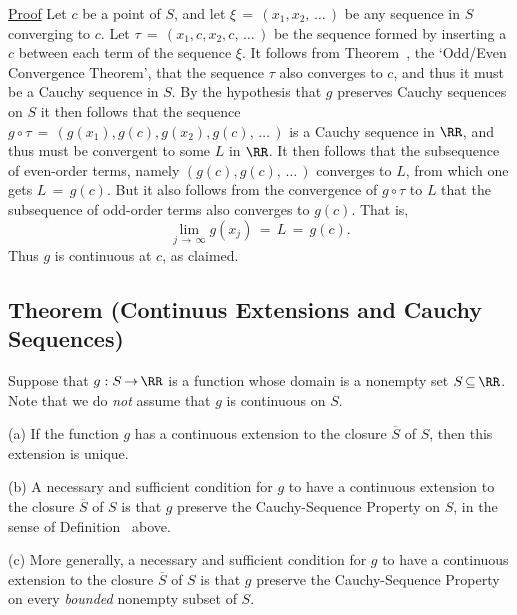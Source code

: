         \underline{Proof} Let $c$ be a point of $S$, and let ${\xi} \,=\, (x_{1},x_{2},\,{\ldots}\,)$ be any sequence in $S$ converging to $c$.
    Let ${\tau} \,=\, (x_{1},c,x_{2},c,\,{\ldots}\,)$ be the sequence formed by inserting a $c$ between each term of the sequence ${\xi}$.
    It follows from Theorem~, the `Odd/Even Convergence Theorem',
that the sequence ${\tau}$ also converges to $c$, and thus it must be a Cauchy sequence in $S$.
    By the hypothesis that $g$ preserves Cauchy sequences on $S$ it then follows that the sequence $g{\circ}{\tau} \,=\, (g(x_{1}),g(c),g(x_{2}),g(c),\,{\ldots}\,)$ is a Cauchy sequence in ${\RR}$, and thus must be convergent to some $L$ in ${\RR}$.
    It then follows that the subsequence of even-order terms, namely $(g(c),g(c),\,{\ldots}\,)$ converges to $L$, from which one gets $L \,=\, g(c)$.
    But it also follows from the convergence of $g{\circ}{\tau}$ to $L$ that the subsequence of odd-order terms also converges to $g(c)$.
    That is,
        \begin{displaymath}
        \lim_{j \,{\rightarrow}\, {\infty}} g(x_{j}) \,=\, L \,=\, g(c).
        \end{displaymath}
    Thus $g$ is continuous at $c$, as claimed.

\V
\V

            \subsection{\small{\bf Theorem} (Continuus Extensions and Cauchy Sequences)}
            \label{ThmF20.90}

\V

        Suppose that $g:S \,{\rightarrow}\, {\RR}$ is a function whose domain is a nonempty set $S \,{\subseteq}\, {\RR}$.
    Note that we do {\em not} assume that $g$ is continuous on $S$.

\V

        (a) If the function $g$ has a continuous extension to the closure $\overline{S}$ of $S$, then this extension is unique.

\V


        (b) A necessary and sufficient condition for $g$ to have a continuous extension to the closure $\overline{S}$ of $S$ is that $g$ preserve the Cauchy-Sequence Property on $S$, in the sense of Definition~ above.

\V

        (c) More generally, a necessary and sufficient condition for $g$ to have a continuous extension to the closure $\overline{S}$ of $S$ is that $g$ preserve the Cauchy-Sequence Property on every {\em bounded} nonempty subset of $S$.

